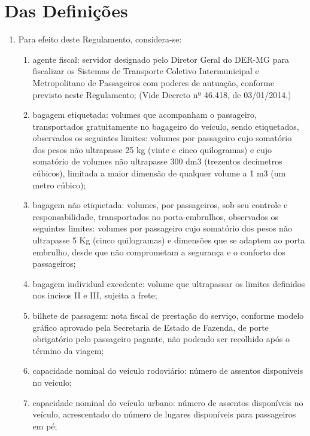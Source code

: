 \section{Das Definições}

\begin{enumerate}[resume,label=Art. \arabic*]

\item Para efeito deste Regulamento, considera-se:

\begin{enumerate}[label=\roman*.]

\item agente fiscal: servidor designado pelo Diretor Geral do DER-MG para fiscalizar os Sistemas de Transporte Coletivo Intermunicipal e Metropolitano de Passageiros com poderes de autuação, conforme previsto neste Regulamento; (Vide Decreto nº 46.418, de 03/01/2014.)

\item bagagem etiquetada: volumes que acompanham o passageiro, transportados gratuitamente no bagageiro do veículo, sendo etiquetados, observados os seguintes limites: volumes por passageiro cujo somatório dos pesos não ultrapasse 25 kg (vinte e cinco quilogramas) e cujo somatório de volumes não ultrapasse 300 dm3 (trezentos decímetros cúbicos), limitada a maior dimensão de qualquer volume a 1 m3 (um metro cúbico);

\item bagagem não etiquetada: volumes, por passageiros, sob seu controle e responsabilidade, transportados no porta-embrulhos, observados os seguintes limites: volumes por passageiro cujo somatório dos pesos não ultrapasse 5 Kg (cinco quilogramas) e dimensões que se adaptem ao porta embrulho, desde que não comprometam a segurança e o conforto dos passageiros;

\item bagagem individual excedente: volume que ultrapassar os limites definidos nos incisos II e III, sujeita a frete;

\item bilhete de passagem: nota fiscal de prestação do serviço, conforme modelo gráfico aprovado pela Secretaria de Estado de Fazenda, de porte obrigatório pelo passageiro pagante, não podendo ser recolhido após o término da viagem;

\item capacidade nominal do veículo rodoviário: número de assentos disponíveis no veículo;

\item capacidade nominal do veículo urbano: número de assentos disponíveis no veículo, acrescentado do número de lugares disponíveis para passageiros em pé;


\end{enumerate}
\end{enumerate}
